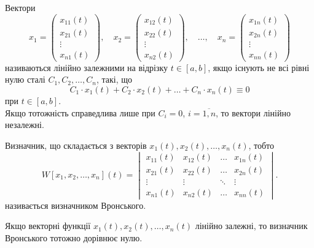 \begin{definition}
	Вектори \[ x_1 = \begin{pmatrix} x_{11}(t) \\ x_{21}(t) \\ \vdots \\ x_{n1}(t) \end{pmatrix}, \quad x_2 = \begin{pmatrix} x_{12}(t) \\ x_{22}(t) \\ \vdots \\ x_{n2}(t) \end{pmatrix}, \quad \ldots, \quad x_n = \begin{pmatrix} x_{1n}(t) \\ x_{2n}(t) \\ \vdots \\ x_{nn}(t) \end{pmatrix} \] називаються лінійно залежними на відрізку $t \in [a, b]$, якщо існують не всі рівні нулю сталі $C_1, C_2, \ldots, C_n$, такі, що 
	\begin{equation*}
		C_1 \cdot x_1(t) + C_2 \cdot x_2(t) + \ldots + C_n \cdot x_n(t) \equiv 0
	\end{equation*}
	при $t \in [a, b]$. \\

	Якщо тотожність справедлива лише при $C_i = 0$, $i = \overline{1, n}$, то вектори лінійно незалежні.
\end{definition}

\begin{definition}
	Визначник, що складається з векторів $x_1(t), x_2(t), \ldots, x_n(t)$, тобто
	\begin{equation*}
		W[x_1, x_2, \ldots, x_n](t) = \begin{vmatrix} x_{11}(t) & x_{12}(t) & \ldots & x_{1n}(t) \\ x_{21}(t) & x_{22}(t) & \ldots & x_{2n}(t) \\ \vdots & \vdots & \ddots & \vdots \\ x_{n1}(t) & x_{n2}(t) & \ldots & x_{nn}(t) \end{vmatrix}.
	\end{equation*}
	називається визначником Вронського.
\end{definition}

\begin{theorem}
	Якщо векторні функції $x_1(t), x_2(t), \ldots, x_n(t)$ лінійно залежні, то визначник Вронського тотожно дорівнює нулю.
\end{theorem}

